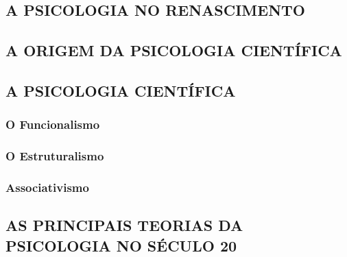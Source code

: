 \documentclass[
]{book}
\theoremstyle{definition}
\theoremstyle{definition}
\theoremstyle{definition}
\theoremstyle{definition}
\theoremstyle{remark}
\begin{document}
\hypertarget{a-psicologia-no-renascimento}{%
\subsection*{A PSICOLOGIA NO RENASCIMENTO}\label{a-psicologia-no-renascimento}}

\hypertarget{a-origem-da-psicologia-cientuxedfica}{%
\subsection*{A ORIGEM DA PSICOLOGIA CIENTÍFICA}\label{a-origem-da-psicologia-cientuxedfica}}

\hypertarget{a-psicologia-cientuxedfica}{%
\subsection*{A PSICOLOGIA CIENTÍFICA}\label{a-psicologia-cientuxedfica}}

\hypertarget{o-funcionalismo}{%
\subsubsection*{O Funcionalismo}\label{o-funcionalismo}}

\hypertarget{o-estruturalismo}{%
\subsubsection*{O Estruturalismo}\label{o-estruturalismo}}

\hypertarget{associativismo}{%
\subsubsection*{Associativismo}\label{associativismo}}

\hypertarget{as-principais-teorias-da-psicologia-no-suxe9culo-20}{%
\subsection*{AS PRINCIPAIS TEORIAS DA PSICOLOGIA NO SÉCULO 20}\label{as-principais-teorias-da-psicologia-no-suxe9culo-20}}
\end{document}
